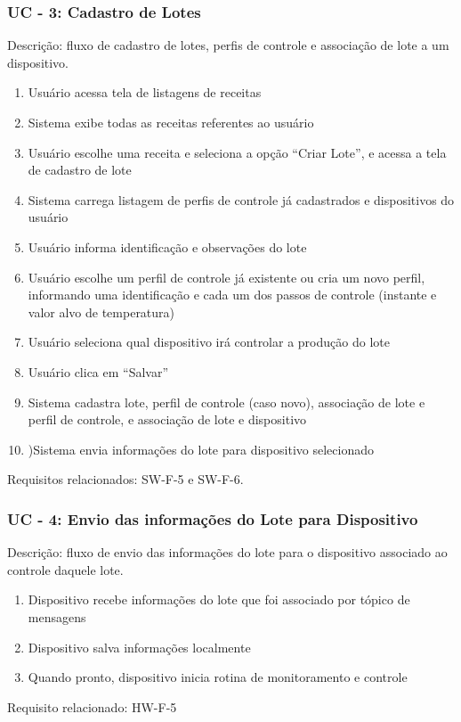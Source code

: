 \subsubsection*{UC - 3: Cadastro de Lotes}
Descrição: fluxo de cadastro de lotes, perfis de controle e associação de lote a um dispositivo.
\begin{enumerate}
    \item Usuário acessa tela de listagens de receitas
    \item Sistema exibe todas as receitas referentes ao usuário
    \item Usuário escolhe uma receita e seleciona a opção “Criar Lote”, e acessa a tela de cadastro de lote
    \item Sistema carrega listagem de perfis de controle já cadastrados e dispositivos do usuário
    \item Usuário informa identificação e observações do lote
    \item Usuário escolhe um perfil de controle já existente ou cria um novo perfil, informando uma identificação e cada um dos passos de controle (instante e valor alvo de temperatura)
    \item Usuário seleciona qual dispositivo irá controlar a produção do lote
    \item Usuário clica em “Salvar”
    \item Sistema cadastra lote, perfil de controle (caso novo), associação de lote e perfil de controle, e associação de lote e dispositivo
    \item )Sistema envia informações do lote para dispositivo selecionado
\end{enumerate}
Requisitos relacionados: SW-F-5 e SW-F-6.

\subsubsection*{UC - 4: Envio das informações do Lote para Dispositivo}
Descrição: fluxo de envio das informações do lote para o dispositivo associado ao controle daquele lote.
\begin{enumerate}
    \item Dispositivo recebe informações do lote que foi associado por tópico de mensagens
    \item Dispositivo salva informações localmente
    \item Quando pronto, dispositivo inicia rotina de monitoramento e controle
\end{enumerate}    
Requisito relacionado: HW-F-5

